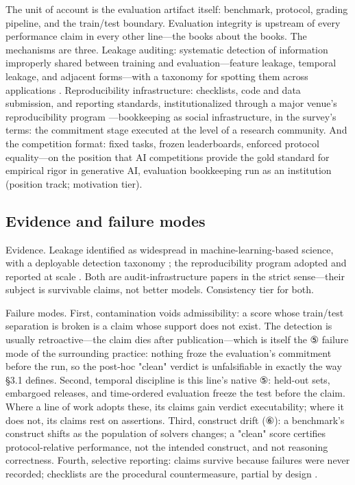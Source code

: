 \documentclass[11pt,a4paper]{article}
\begin{document}
The unit of account is the evaluation artifact itself: benchmark, protocol, grading pipeline, and the train/test boundary. Evaluation integrity is upstream of every performance claim in every other line—the books about the books. The mechanisms are three. Leakage auditing: systematic detection of information improperly shared between training and evaluation—feature leakage, temporal leakage, and adjacent forms—with a taxonomy for spotting them across applications \cite{key07}. Reproducibility infrastructure: checklists, code and data submission, and reporting standards, institutionalized through a major venue's reproducibility program \cite{key08}—bookkeeping as social infrastructure, in the survey's terms: the commitment stage executed at the level of a research community. And the competition format: fixed tasks, frozen leaderboards, enforced protocol equality—on the position that AI competitions provide the gold standard for empirical rigor in generative AI, evaluation bookkeeping run as an institution \cite{key35} (position track; motivation tier).

\subsection{Evidence and failure modes}

Evidence. Leakage identified as widespread in machine-learning-based science, with a deployable detection taxonomy \cite{key07}; the reproducibility program adopted and reported at scale \cite{key08}. Both are audit-infrastructure papers in the strict sense—their subject is survivable claims, not better models. Consistency tier for both.

Failure modes. First, contamination voids admissibility: a score whose train/test separation is broken is a claim whose support does not exist. The detection is usually retroactive—the claim dies after publication—which is itself the ⑤ failure mode of the surrounding practice: nothing froze the evaluation's commitment before the run, so the post-hoc "clean" verdict is unfalsifiable in exactly the way §3.1 defines. Second, temporal discipline is this line's native ⑤: held-out sets, embargoed releases, and time-ordered evaluation freeze the test before the claim. Where a line of work adopts these, its claims gain verdict executability; where it does not, its claims rest on assertions. Third, construct drift (⑥): a benchmark's construct shifts as the population of solvers changes; a "clean" score certifies protocol-relative performance, not the intended construct, and not reasoning correctness. Fourth, selective reporting: claims survive because failures were never recorded; checklists are the procedural countermeasure, partial by design \cite{key08}.
\end{document}

